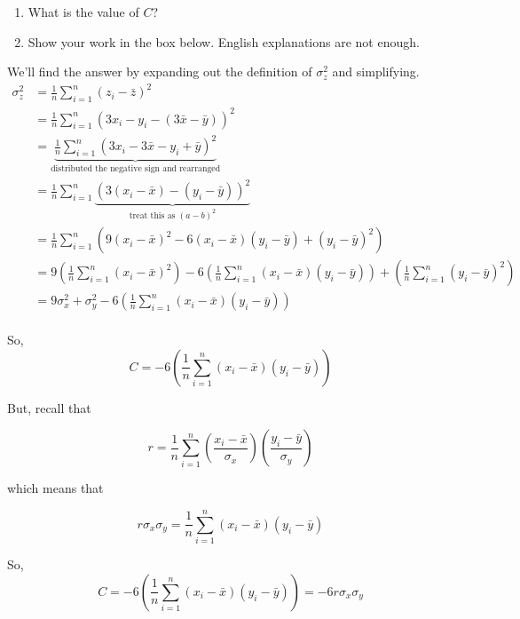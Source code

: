 \documentclass[11pt]{article}
\begin{document}
\begin{prob}
\begin{subprob}
\begin{enumerate}[label=(\roman*)]
  \item What is the value of $C$? 

       
  \item Show your work in the box below. English explanations are not enough.
\end{enumerate}

\emptybox{9.5cm}

\begin{solution}
We'll find the answer by expanding out the definition of $\sigma_z^2$ and simplifying.
\begin{align*}
  \sigma_z^2 &= \frac{1}{n} \sum_{i=1}^n (z_i - \bar{z})^2 \\
  &= \frac{1}{n} \sum_{i=1}^n (3x_i - y_i - (3\bar{x} - \bar{y}))^2 \\
  &= \underbrace{\frac{1}{n} \sum_{i=1}^n (3x_i - 3\bar{x} - y_i + \bar{y})^2}_\text{distributed the negative sign and rearranged} \\
  &= \frac{1}{n} \sum_{i=1}^n \underbrace{(3(x_i - \bar{x}) - (y_i - \bar{y}))^2}_\text{treat this as $(a - b)^2$} \\
  &= \frac{1}{n} \sum_{i=1}^n \left( 9(x_i - \bar{x})^2 - 6(x_i - \bar{x})(y_i - \bar{y}) + (y_i - \bar{y})^2 \right) \\
  &= 9 \left(\frac{1}{n} \sum_{i=1}^n (x_i - \bar{x})^2 \right) - 6 \left(\frac{1}{n} \sum_{i=1}^n (x_i - \bar{x})(y_i - \bar{y})\right) + \left(\frac{1}{n} \sum_{i=1}^n (y_i - \bar{y})^2 \right) \\
  &= 9 \sigma_x^2 + \sigma_y^2 - 6 \left(\frac{1}{n} \sum_{i=1}^n (x_i - \bar{x})(y_i - \bar{y})\right) \\
\end{align*}

So, $$C = -6 \left(\frac{1}{n} \sum_{i=1}^n (x_i - \bar{x})(y_i - \bar{y})\right)$$

But, recall that

$$r = \frac{1}{n} \sum_{i=1}^n \left( \frac{x_i - \bar{x}}{\sigma_x} \right) \left( \frac{y_i - \bar{y}}{\sigma_y} \right)$$

which means that

$$r \sigma_x \sigma_y = \frac{1}{n} \sum_{i=1}^n (x_i - \bar{x})(y_i - \bar{y})$$

So, $$C = -6 \left(\frac{1}{n} \sum_{i=1}^n (x_i - \bar{x})(y_i - \bar{y})\right) = -6r \sigma_x \sigma_y$$

\end{solution}
\end{subprob}

\end{prob}
\end{document}
